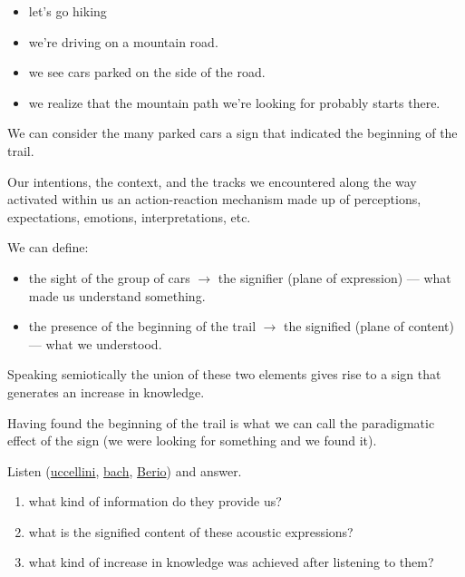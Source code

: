 \begin{itemize}
\tightlist
\item let's go hiking
\item we're driving on a mountain road.
\item we see cars parked on the side of the road.
\item we realize that the mountain path we're looking for probably starts there.
\end{itemize}

We can consider the many parked cars a sign that indicated the beginning of the trail.

Our intentions, the context, and the tracks we encountered along the way activated within us an action-reaction mechanism made up of perceptions, expectations, emotions, interpretations, etc.

We can define:

\begin{itemize}
\tightlist
\item the sight of the group of cars \(\rightarrow\) the signifier (plane of expression) --- what made us understand something.
\item the presence of the beginning of the trail \(\rightarrow\) the signified (plane of content) --- what we understood.
\end{itemize}

Speaking semiotically the union of these two elements gives rise to a sign that generates an increase in knowledge.

Having found the beginning of the trail is what we can call the paradigmatic effect of the sign (we were looking for something and we found it).

Listen (\href{https://github.com/musicaecodice/EMC/blob/main/1_premises/suoni/uccellini.mp3}{uccellini}, \href{https://github.com/musicaecodice/EMC/blob/main/1_premises/suoni/bach_1.mp3}{bach}, \href{https://github.com/musicaecodice/EMC/blob/main/1_premises/suoni/berio.mp3}{Berio}) and answer.

\begin{enumerate}
\def\labelenumi{\arabic{enumi}.}
\tightlist
\item what kind of information do they provide us?
\item what is the signified content of these acoustic expressions?
\item what kind of increase in knowledge was achieved after listening to them?
\end{enumerate}

